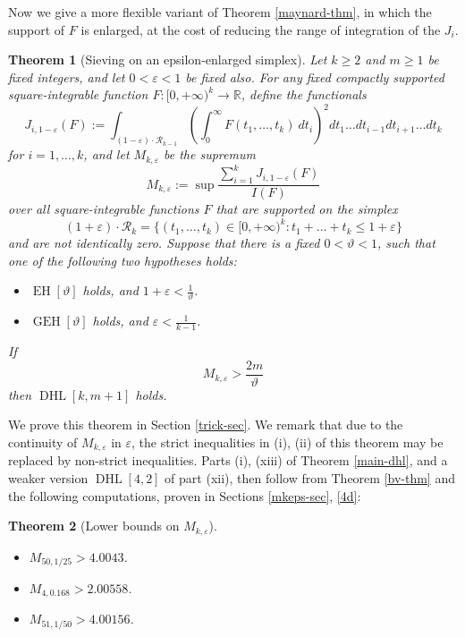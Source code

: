 \documentclass{bmcart}
\DeclareMathOperator*\EH{EH}
\DeclareMathOperator*\GEH{GEH}
\DeclareMathOperator*\DHL{DHL}
\theoremstyle{plain}
\newtheorem{theorem}{Theorem}[section]
\theoremstyle{definition}
\newcommand\R{\mathbb{R}}
\newcommand\eps{\varepsilon}
\begin{document}
Now we give a more flexible variant of Theorem \ref{maynard-thm}, in which the support of $F$ is enlarged, at the cost of reducing the range of integration of the $J_i$.

\begin{theorem}[Sieving on an epsilon-enlarged simplex]\label{epsilon-trick}  Let $k \geq 2$ and $m \geq 1$ be fixed integers, and let $0 < \eps < 1$ be fixed also. For any fixed compactly supported square-integrable function $F: [0,+\infty)^k \to \R$, define the functionals
$$ J_{i,1-\eps}(F) := \int_{(1-\eps) \cdot {\mathcal R}_{k-1}} \left(\int_0^\infty F(t_1,\dots,t_k)\ dt_i\right)^2 dt_1 \dots dt_{i-1} dt_{i+1} \dots dt_k$$
for $i=1,\dots,k$, and let $M_{k,\eps}$ be the supremum
$$ M_{k,\eps} := \sup \frac{\sum_{i=1}^k J_{i,1-\eps}(F)}{I(F)}$$
over all square-integrable functions $F$ that are supported on the simplex
$$ (1+\eps) \cdot {\mathcal R}_k = \{ (t_1,\dots,t_k) \in [0,+\infty)^k: t_1+\dots+t_k \leq 1+\eps \}$$
and are not identically zero.  Suppose that there is a fixed $0 < \vartheta < 1$, such that one of the following two hypotheses holds:
\begin{itemize}
\item[(i)]  $\EH[\vartheta]$ holds, and $1+\eps < \frac{1}{\vartheta}$.
\item[(ii)] $\GEH[\vartheta]$ holds, and $\eps < \frac{1}{k-1}$.
\end{itemize}
If
$$ M_{k,\eps} > \frac{2m}{\vartheta}$$
then $\DHL[k,m+1]$ holds.
\end{theorem}

We prove this theorem in Section \ref{trick-sec}.  We remark that due to the continuity of $M_{k,\eps}$ in $\eps$, the strict inequalities in (i), (ii) of this theorem may be replaced by non-strict inequalities. Parts (i), (xiii) of Theorem \ref{main-dhl}, and a weaker version $\DHL[4,2]$ of part (xii), then follow from Theorem \ref{bv-thm} and the following computations, proven in Sections \ref{mkeps-sec}, \ref{4d}:

\begin{theorem}[Lower bounds on $M_{k,\eps}$]\label{mke-lower}\
\begin{itemize}
\item[(i)] $M_{50,1/25} > 4.0043$.
\item[(xii$'$)] $M_{4,0.168} > 2.00558$.
\item[(xiii)] $M_{51,1/50} > 4.00156$.
\end{itemize}
\end{theorem}
\end{document}
